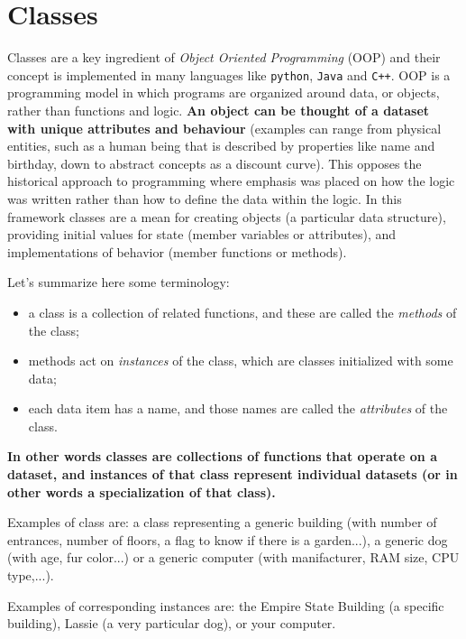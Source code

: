 \section{Classes}\label{classes}

Classes are a key ingredient of \emph{Object Oriented Programming} (OOP) and their concept is implemented in many languages like \texttt{python}, \texttt{Java} and \texttt{C++}. OOP is a programming model in which programs are organized around data, or objects, rather than functions and logic.
\textbf{An object can be thought of a dataset with unique attributes and behaviour} (examples can range from physical entities, such as a human being that is described by properties like name and birthday, down to abstract concepts as a discount curve). This opposes the historical approach to programming where emphasis was placed on how the logic was written rather than how to define the data within the logic. In this framework classes are a mean for creating objects (a particular data structure), providing initial values for state (member variables or attributes), and implementations of behavior (member functions or methods).

Let's summarize here some terminology:

\begin{itemize}
\tightlist
\item a class is a collection of related functions, and these are called the \emph{methods} of the class;
\item methods act on \emph{instances} of the class, which are classes initialized with some data;
\item each data item has a name, and those names are called the \emph{attributes} of the class.
\end{itemize}

\textbf{In other words classes are collections of functions that operate on a dataset, and instances of that class represent individual datasets (or in other words a specialization of that class).}

Examples of class are: a class representing a generic building (with number of entrances, number of floors, a flag to know if there is a garden...), a generic dog (with age, fur color...) or a generic computer (with manifacturer, RAM size, CPU type,...).

Examples of corresponding instances are: the Empire State Building (a specific building), Lassie (a very particular dog), or your computer.

